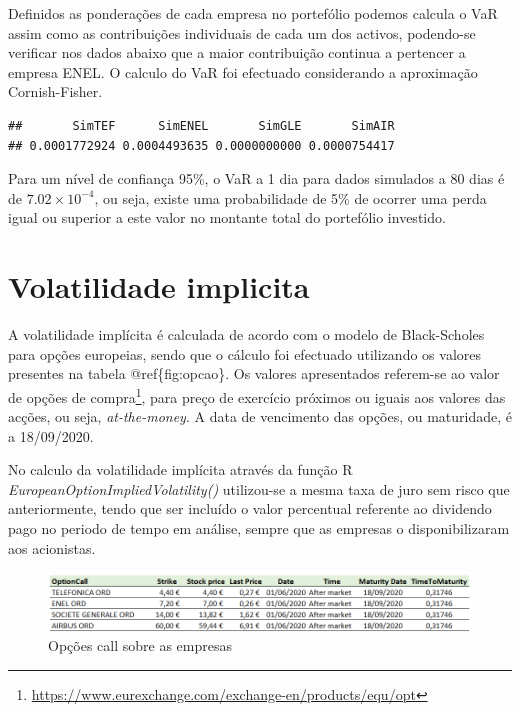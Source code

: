 \documentclass[
  12pt,
  a4paper,
  openany]{book}
\theoremstyle{definition}
\theoremstyle{definition}
\theoremstyle{definition}
\theoremstyle{remark}
\begin{document}
Definidos as ponderações de cada empresa no portefólio podemos calcula o VaR assim como as contribuições individuais de cada um dos activos, podendo-se verificar nos dados abaixo que a maior contribuição continua a pertencer a empresa ENEL. O calculo do VaR foi efectuado considerando a aproximação Cornish-Fisher.

\begin{verbatim}
##       SimTEF      SimENEL       SimGLE       SimAIR 
## 0.0001772924 0.0004493635 0.0000000000 0.0000754417
\end{verbatim}

Para um nível de confiança 95\%, o VaR a 1 dia para dados simulados a 80 dias é de \ensuremath{7.02\times 10^{-4}}, ou seja, existe uma probabilidade de 5\% de ocorrer uma perda igual ou superior a este valor no montante total do portefólio investido.

\hypertarget{volatilidade-implicita}{%
\section{Volatilidade implicita}\label{volatilidade-implicita}}

A volatilidade implícita é calculada de acordo com o modelo de Black-Scholes para opções europeias, sendo que o cálculo foi efectuado utilizando os valores presentes na tabela @ref\{fig:opcao\}. Os valores apresentados referem-se ao valor de opções de compra\footnote{\url{https://www.eurexchange.com/exchange-en/products/equ/opt}}, para preço de exercício próximos ou iguais aos valores das acções, ou seja, \emph{at-the-money}. A data de vencimento das opções, ou maturidade, é a 18/09/2020.

No calculo da volatilidade implícita através da função R \emph{EuropeanOptionImpliedVolatility()} utilizou-se a mesma taxa de juro sem risco que anteriormente, tendo que ser incluído o valor percentual referente ao dividendo pago no periodo de tempo em análise, sempre que as empresas o disponibilizaram aos acionistas.

\begin{figure}

{\centering \includegraphics[width=1\linewidth]{image/opcao} 

}

\caption{Opções call sobre as empresas }\label{fig:opcao}
\end{figure}
\FloatBarrier
\centering
\end{document}

